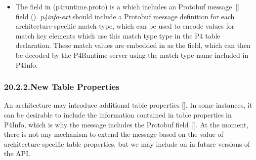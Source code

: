 \documentclass[11pt]{article}
\begin{document}
{\begin{itemize}
\item{}
The  field in  (p4runtime.proto) is a
 which includes an  Protobuf message~[] field
(). \emph{p4info-ext} should include a Protobuf message definition for each
architecture-specific match type, which can be used to encode values for match
key elements which use this match type type in the P4 table
declaration. These match values are embedded in  as the
 field, which can then be decoded by the P4Runtime server using the
match type name included in P4Info.%
\end{itemize}%

\subsubsection{20.2.2.\hspace*{0.5em}New Table Properties}\label{sec-new-table-properties}%

\noindent{}An architecture may introduce additional table properties
[]. In some instances, it can be desirable to include the
information contained in table properties in P4Info, which is why the
 message includes the   Protobuf
field~[]. At the moment, there is not any mechanism to extend the
 message based on the value of architecture-specific table
properties, but we may include on in future versions of the API.%

}
\end{document}
